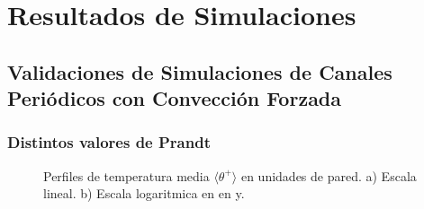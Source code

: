 \chapter{Resultados de Simulaciones}




\newpage

\section{Validaciones de Simulaciones de Canales Periódicos con Convección Forzada}

\subsection{Distintos valores de Prandt}

\begin{figure}[H]
 \centering
 \caption{Perfiles de temperatura media $\langle  \theta^+ \rangle$ en unidades de pared. a) Escala lineal. b) Escala logaritmica en en y.} 
 \label{fig:kawamura_1}
\end{figure}

